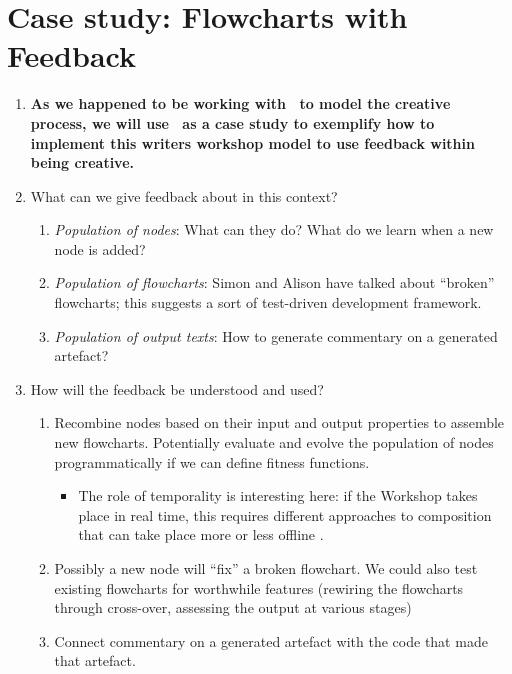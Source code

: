 \section{Case study: Flowcharts with Feedback} \label{sec:implementation}

\begin{enumerate}[start=3]
\item \textbf{As we happened to be working with \Fw\ to model the
  creative process, we will use \Fw\ as a case study to exemplify how
  to implement this writers workshop model to use feedback within
  being creative.}
\item[] What can we give feedback about in this context?
\begin{enumerate}
\item \emph{Population of nodes}: What can they do?  What do we learn when a
  new node is added?
\item \emph{Population of flowcharts}: Simon and Alison have talked
  about ``broken'' flowcharts; this suggests a sort of test-driven
  development framework.
\item \emph{Population of output texts}: How to generate commentary on
  a generated artefact?
\end{enumerate}
\item[] How will the feedback be understood and used?
\begin{enumerate}
\item Recombine nodes based on their input and output properties to
  assemble new flowcharts.  Potentially evaluate and evolve the
  population of nodes programmatically if we can define fitness
  functions.
\begin{itemize}
\item The role of temporality is interesting here: if the Workshop
  takes place in real time, this requires different approaches to
  composition that can take place more or less offline \cite{perez2013rolling}.
\end{itemize}
\item Possibly a new node will ``fix'' a broken flowchart.  We could also test existing flowcharts for worthwhile features (rewiring the flowcharts through cross-over, assessing the output at various stages)
\item Connect commentary on a generated artefact with the code that
  made that artefact.
\end{enumerate}
\end{enumerate}
